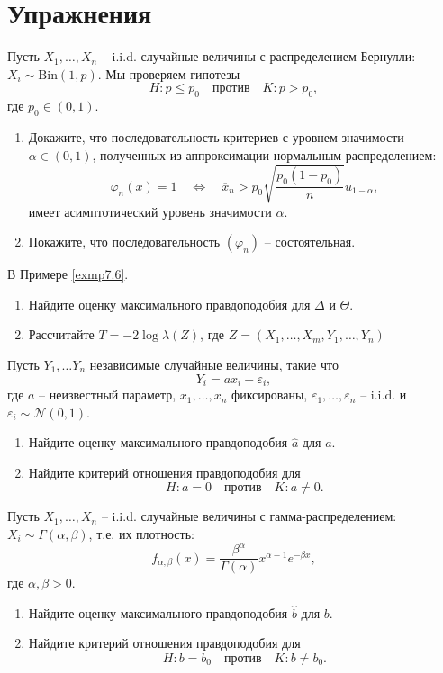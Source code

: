 \section*{Упражнения}
\begin{exc}
	Пусть $X_1, \dots, X_n$ -- i.i.d. случайные величины с распределением Бернулли: $X_i \sim \mathrm{Bin}(1, p)$. Мы проверяем гипотезы
	\[ H: p \leq p_0 \quad \text{против} \quad K: p > p_0, \]
	где $p_0 \in (0, 1)$.
	\begin{enumerate}
		\item Докажите, что последовательность критериев с уровнем значимости $\alpha \in (0, 1)$, полученных из аппроксимации нормальным распределением:
		\[ \varphi_n(x) = 1 \quad \Leftrightarrow \quad \overline{x}_n > p_0 \sqrt{\frac{p_0(1-p_0)}{n}} u_{1-\alpha}, \]
		имеет асимптотический уровень значимости $\alpha$.
		\item Покажите, что последовательность $(\varphi_n)$ -- состоятельная.
	\end{enumerate}
\end{exc}

\begin{exc}
	В Примере \ref{exmp7.6}.
	\begin{enumerate}
		\item Найдите оценку максимального правдоподобия для $\Delta$ и $\Theta$.
		\item Рассчитайте $T = -2\log \lambda(Z)$, где $Z = (X_1,\dots, X_m, Y_1, \dots, Y_n)$
	\end{enumerate}
\end{exc}

\begin{exc}
	Пусть $Y_1, \dots Y_n$ независимые случайные величины, такие что
	\[ Y_i = a x_i + \varepsilon_i, \]
	где $a$ -- неизвестный параметр, $x_1, \dots, x_n$ фиксированы, $\varepsilon_1, \dots, \varepsilon_n$ -- i.i.d. и $\varepsilon_i \sim \mathcal{N}(0, 1)$. 
	\begin{enumerate}
		\item Найдите оценку максимального правдоподобия $\hat{a}$ для $a$.
		\item Найдите критерий отношения правдоподобия для 
		\[ H:a = 0 \quad \text{против} \quad K: a \neq 0. \]
	\end{enumerate}
\end{exc}

\begin{exc}
	Пусть $X_1, \dots, X_n$ -- i.i.d. случайные величины с гамма-распределением: $X_i \sim \Gamma(\alpha, \beta)$, т.е. их плотность:
	\[ f_{\alpha, \beta}(x) = \frac{\beta^\alpha}{\Gamma(\alpha)} x^{\alpha - 1} e^{-\beta x}, \]
	где $\alpha, \beta > 0$.
	\begin{enumerate}
		\item Найдите оценку максимального правдоподобия $\hat{b}$ для $b$.
		\item Найдите критерий отношения правдоподобия для 
		\[ H:b = b_0 \quad \text{против} \quad K: b \neq b_0. \]
	\end{enumerate}
\end{exc}

